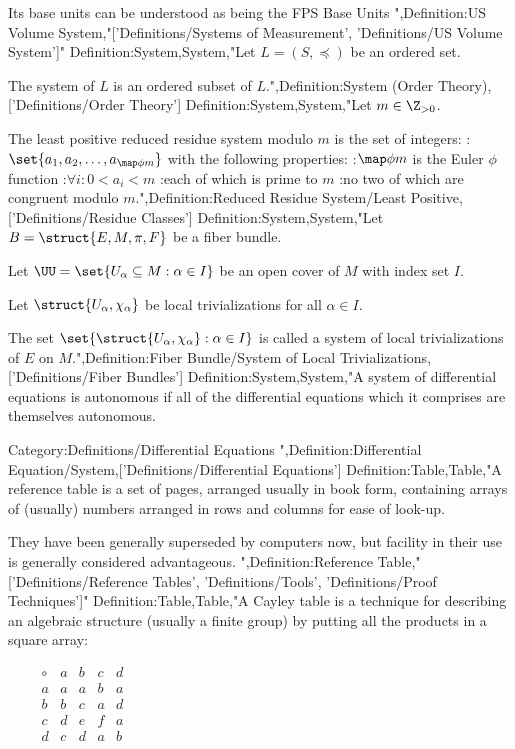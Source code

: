 Its base units can be understood as being the FPS Base Units
",Definition:US Volume System,"['Definitions/Systems of Measurement', 'Definitions/US Volume System']"
Definition:System,System,"Let $L = \left({S, \preceq}\right)$ be an ordered set.


The system of $L$ is an ordered subset of $L$.",Definition:System (Order Theory),['Definitions/Order Theory']
Definition:System,System,"Let $m \in \Z_{> 0}$.

The least positive reduced residue system modulo $m$ is the set of integers:
:$\set {a_1, a_2, \ldots, a_{\map \phi m} }$
with the following properties:
:$\map \phi m$ is the Euler $\phi$ function
:$\forall i: 0 < a_i < m$
:each of which is prime to $m$
:no two of which are congruent modulo $m$.",Definition:Reduced Residue System/Least Positive,['Definitions/Residue Classes']
Definition:System,System,"Let $B = \struct {E, M, \pi, F}$ be a fiber bundle. 

Let $\UU = \set {U_\alpha \subseteq M: \alpha \in I}$ be an open cover of $M$ with index set $I$. 

Let $\struct {U_\alpha, \chi_\alpha}$ be local trivializations for all $\alpha \in I$. 


The set $\set {\struct {U_\alpha, \chi_\alpha}: \alpha \in I}$ is called a system of local trivializations of $E$ on $M$.",Definition:Fiber Bundle/System of Local Trivializations,['Definitions/Fiber Bundles']
Definition:System,System,"A system of differential equations is autonomous if all of the differential equations which it comprises are themselves autonomous.


Category:Definitions/Differential Equations
",Definition:Differential Equation/System,['Definitions/Differential Equations']
Definition:Table,Table,"A reference table is a set of pages, arranged usually in book form, containing arrays of (usually) numbers arranged in rows and columns for ease of look-up.

They have been generally superseded by computers now, but facility in their use is generally considered advantageous.
",Definition:Reference Table,"['Definitions/Reference Tables', 'Definitions/Tools', 'Definitions/Proof Techniques']"
Definition:Table,Table,"A Cayley table is a technique for describing an algebraic structure (usually a finite group) by putting all the products in a square array:

$\qquad \begin {array} {c|cccc}
\circ & a & b & c & d \\
\hline
a & a & a & b & a \\
b & b & c & a & d \\
c & d & e & f & a \\
d & c & d & a & b \\
\end {array}$


